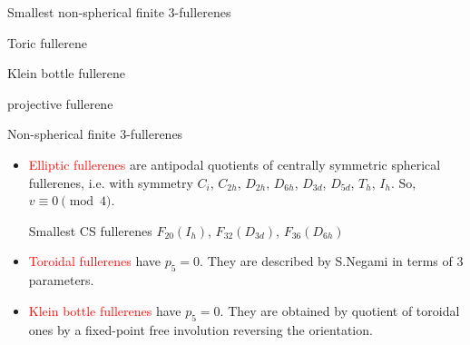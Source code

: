 \documentclass[%
pdf,
colorBG,
slideColor,
]{prosper}
\begin{document}



\begin{slide}{Smallest non-spherical finite $3$-fullerenes}

\begin{center}
\begin{minipage}[b]{3.7cm}
\centering
{}\par
Toric fullerene
\end{minipage}
\begin{minipage}[b]{3.7cm}
\centering
{}\par
Klein bottle fullerene
\end{minipage}
\begin{minipage}[b]{3.7cm}
\centering
{}\par
projective fullerene
\end{minipage}
\end{center}

\end{slide}



\begin{slide}{Non-spherical finite $3$-fullerenes}

\begin{itemize}
\item \textcolor{red}{Elliptic fullerenes} are antipodal quotients of 
centrally
symmetric spherical fullerenes, i.e. with symmetry $C_i$,
$C_{2h}$, $D_{2h}$, $D_{6h}$, $D_{3d}$, $D_{5d}$, $T_h$, $I_h$.
So, $v\equiv 0\pmod 4$. \par
Smallest CS fullerenes $F_{20}(I_h)$, $F_{32}(D_{3d})$, $F_{36}(D_{6h})$
\item \textcolor{red}{Toroidal fullerenes} have $p_5=0$.
They are described by S.Negami in terms of $3$ parameters.
\item \textcolor{red}{Klein bottle fullerenes} have $p_5=0$.
They are obtained by quotient of toroidal ones by a fixed-point free
involution reversing the orientation.
\end{itemize}


\end{slide}
\end{document}
